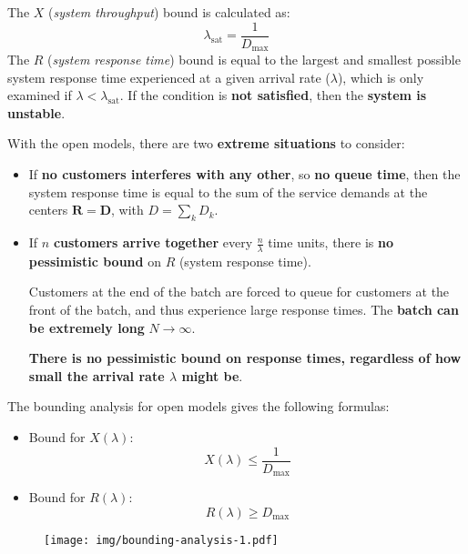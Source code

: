 \highspace
The $X$ (\emph{system throughput}) bound is calculated as:
\begin{equation}
	\lambda_{\text{sat}} = \dfrac{1}{D_{\max}}
\end{equation}
The $R$ (\emph{system response time}) bound is equal to the largest and smallest possible system response time experienced at a given arrival rate ($\lambda$), which is only examined if $\lambda < \lambda_{\text{sat}}$. If the condition is \textbf{not satisfied}, then the \textbf{system is unstable}.

\highspace
With the open models, there are two \textbf{extreme situations} to consider:
\begin{itemize}
	\item If \textbf{no customers interferes with any other}, so \textbf{no queue time}, then the system response time is equal to the sum of the service demands at the centers $\mathbf{R=D}$, with $D = \displaystyle\sum_{k}D_{k}$.
	
	\item If $n$ \textbf{customers arrive together} every $\frac{n}{\lambda}$ time units, there is \textbf{no pessimistic bound} on $R$ (system response time).
	
	Customers at the end of the batch are forced to queue for customers at the front of the batch, and thus experience large response times. The \textbf{batch can be extremely long} $N \rightarrow \infty$.
	
	\textbf{There is no pessimistic bound on response times, regardless of how small the arrival rate $\lambda$ might be}.
\end{itemize}
The bounding analysis for open models gives the following formulas:
\begin{itemize}
	\item Bound for $X\left(\lambda\right)$:
	\begin{equation}
		X\left(\lambda\right) \le \dfrac{1}{D_{\max}}
	\end{equation}
	
	\item Bound for $R\left(\lambda\right)$:
	\begin{equation}
		R\left(\lambda\right) \ge D_{\max}
	\end{equation}
\end{itemize}

\begin{figure}[!htp]
	\centering
	\texttt{[image: img/bounding-analysis-1.pdf]}
\end{figure}


